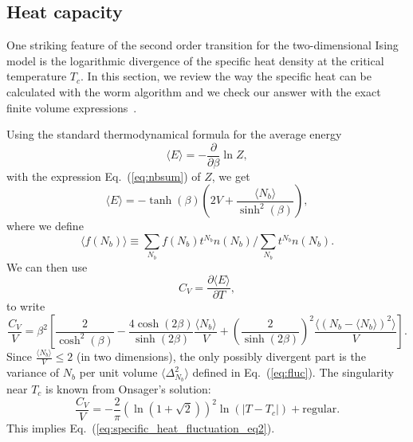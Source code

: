 \documentclass[../main.tex]{subfiles}
\begin{document}
\subsection{Heat capacity}%
\label{ssec:heat_capacity}
One striking feature of the second order transition for the two-dimensional
Ising model is the logarithmic divergence of the specific heat density at the
critical temperature $T_c$.
%
In this section, we review the way the specific heat can be calculated with the
worm algorithm and we check our answer with the exact finite volume
expressions~\cite{bkaufman}.

Using the standard thermodynamical formula for the average energy
%
\begin{equation}
    \langle E \rangle = - \frac{\partial}{\partial \beta} \ln Z,
\end{equation}
%
with the expression Eq.~(\ref{eq:nbsum}) of  $Z$, we get
%
\begin{equation}
    \langle E \rangle = - \tanh(\beta)\left(2V + \frac{\langle
    N_b\rangle}{\sinh^2(\beta)}\right),
\end{equation}
%
where we define
%
\begin{equation}
\langle f(N_b)\rangle \equiv \sum_{N_b} f(N_b)t^{N_b}  n(N_b)/\sum_{N_b}t^{N_b}
n(N_b).
\end{equation}
%
We can then use
%
\begin{equation}
    C_{V} = \frac{\partial \langle E \rangle}{\partial T},
\end{equation}
%
to write
%
\begin{equation}
  \frac{C_V}{V} = \beta^2 {\left[\frac{2}{\cosh^2(\beta)} 
      - \frac{4\cosh(2\beta)}{\sinh(2\beta)}
      \frac{\langle N_b\rangle}{V}
      + {\left(\frac{2}{\sinh(2\beta)}\right)}^2\frac{\langle{(N_b 
  - \langle N_b\rangle)}^2\rangle}{V} \right]}.
\end{equation}
%
Since $\frac{\langle N_b\rangle}{V}\leq 2$ (in two dimensions), the only
possibly divergent part is the variance of $N_b$ per unit volume $\langle
\Delta_{N_b}^2\rangle$ defined in Eq.~(\ref{eq:fluc}).
%
The singularity near $T_c$ is known from Onsager's solution:
%
\begin{equation}
    \frac{C_V}{V} = -\frac{2}{\pi}{\left(\ln(1+\sqrt{2})\right)}^2
    \ln{\left(|T - T_c|\right)} + \text{regular}.
    \label{eq:onsager}
\end{equation}
%
This implies Eq.~(\ref{eq:specific_heat_fluctuation_eq2}).  
%
\end{document}
